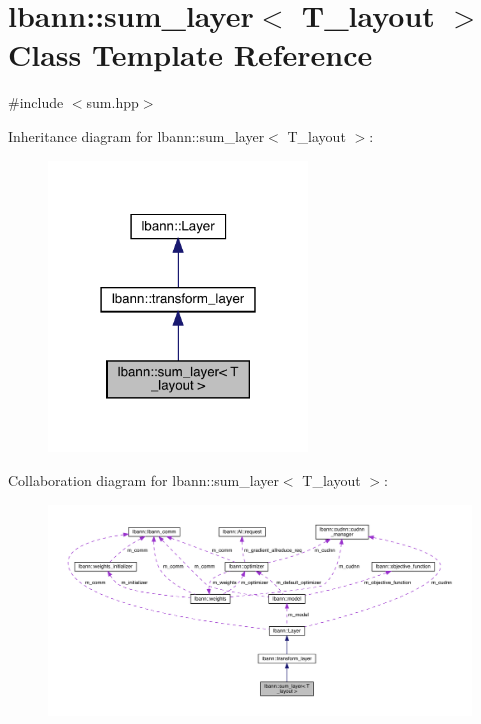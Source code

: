 \hypertarget{classlbann_1_1sum__layer}{}\section{lbann\+:\+:sum\+\_\+layer$<$ T\+\_\+layout $>$ Class Template Reference}
\label{classlbann_1_1sum__layer}


{\ttfamily \#include $<$sum.\+hpp$>$}



Inheritance diagram for lbann\+:\+:sum\+\_\+layer$<$ T\+\_\+layout $>$\+:\nopagebreak
\begin{figure}[H]
\begin{center}
\leavevmode
\includegraphics[width=195pt]{classlbann_1_1sum__layer__inherit__graph}
\end{center}
\end{figure}


Collaboration diagram for lbann\+:\+:sum\+\_\+layer$<$ T\+\_\+layout $>$\+:\nopagebreak
\begin{figure}[H]
\begin{center}
\leavevmode
\includegraphics[width=350pt]{classlbann_1_1sum__layer__coll__graph}
\end{center}
\end{figure}
